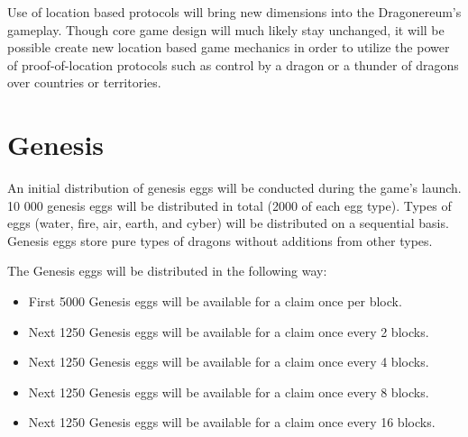 \documentclass[12pt]{article}
\begin{document}
Use of location based protocols will bring new dimensions into the Dragonereum’s gameplay. Though core game design will much likely stay unchanged, it will be possible create new location based game mechanics in order to utilize the power of proof-of-location protocols such as control by a dragon or a thunder of dragons over countries or territories.\\



\newpage
\par

\section{Genesis}
 \label{Genesis}  \par

An initial distribution of genesis eggs will be conducted during the game’s launch. 10 000 genesis eggs will be distributed in total (2000 of each egg type). Types of eggs (water, fire, air, earth, and cyber) will be distributed on a sequential basis. Genesis eggs store pure types of dragons without additions from other types.\par

\begin{samepage}
The Genesis eggs will be distributed in the following way:\par
\begin{itemize}
\item First 5000 Genesis eggs will be available for a claim once per block.\par

\item Next 1250 Genesis eggs will be available for a claim once every 2 blocks.\par

\item Next 1250 Genesis eggs will be available for a claim once every 4 blocks.\par

\item Next 1250 Genesis eggs will be available for a claim once every 8 blocks.\par

\item Next 1250 Genesis eggs will be available for a claim once every 16 blocks.\par
\end{itemize}\par
\end{samepage}
\end{document}
